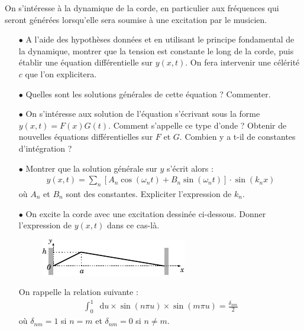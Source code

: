 \documentclass{report}
\newcommand*\dif{\mathop{}\!\mathrm{d}}
\begin{document}
On s'intéresse à la dynamique de la corde, en particulier aux fréquences qui seront générées lorsqu'elle sera soumise à une excitation par le musicien.

\begin{itemize}

\item[$\bullet$] A l'aide des hypothèses données et en utilisant le principe fondamental de la dynamique, montrer que la tension est constante le long de la corde, puis établir une équation différentielle sur $y(x,t)$. On fera intervenir une célérité $c$ que l'on explicitera. 

\item[$\bullet$] Quelles sont les solutions générales de cette équation ? Commenter.

\item[$\bullet$] On s'intéresse aux solution de l'équation s'écrivant sous la forme $y(x,t)=F(x)G(t)$. Comment s'appelle ce type d'onde ? Obtenir de nouvelles équations différentielles sur $F$ et $G$. Combien y a t-il de constantes d'intégration ?

\item[$\bullet$] Montrer que la solution générale sur $y$ s'écrit alors : 
\begin{align*}
	y(x,t)=\sum_n \left[A_n\cos(\omega_nt) + B_n\sin(\omega_nt)\right] \cdot\sin(k_nx)
\end{align*}
où $A_n$ et $B_n$ sont des constantes. Expliciter l'expression de $k_n$. 

\item[$\bullet$] On excite la corde avec une excitation dessinée ci-dessous. Donner l'expression de $y(x,t)$ dans ce cas-là.
	
	\begin{figure}[h!]
	\centering
		\includegraphics[scale=1.5]{onde2.pdf}
	\end{figure}

On rappelle la relation suivante :
	\begin{align*}
	\int_0^1\dif u\times\sin(n\pi u)\times\sin(m\pi u)=\frac{\delta_{nm}}{2}
	\end{align*}			
où $\delta_{nm}=1$ si $n=m$ et $\delta_{nm}=0$ si $n\neq m$.

\end{itemize}
\end{document}
